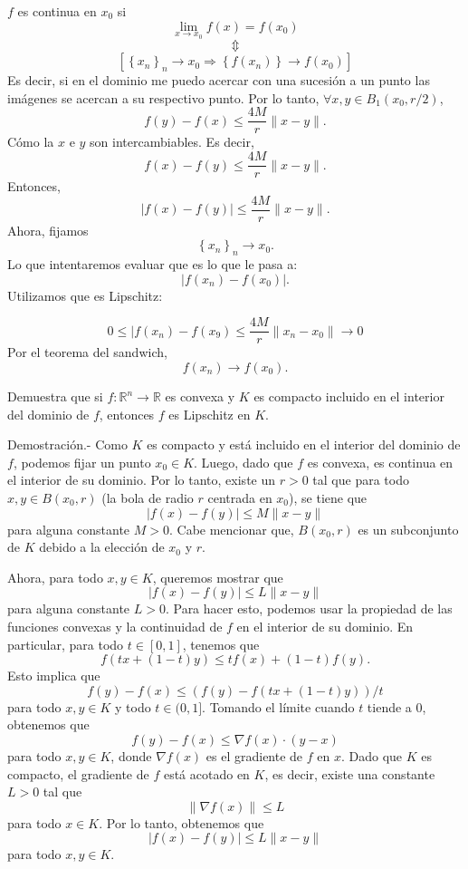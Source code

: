 \begin{paracol}{2}
\begin{teo}
{	    $f$ es continua en $x_0$ si 
	    $$\lim_{x\to x_0}f(x)=f(x_0)$$ 
	    $$\Updownarrow$$
	    $$\left[\left\{x_n\right\}_n\to x_0 \Rightarrow \left\{f(x_n)\right\}\to f(x_0)\right]$$
	    Es decir, si en el dominio me puedo acercar con una sucesión a un punto las imágenes se acercan a su respectivo punto.
	}
	\switchcolumn[0]\noindent
	Por lo tanto, $\forall x,y\in B_1(x_0,r/2)$,
	$$f(y)-f(x)\leq \dfrac{4M}{r}\|x-y\|.$$
	Cómo la $x$ e $y$ son intercambiables. Es decir,
	$$f(x)-f(y)\leq \dfrac{4M}{r}\|x-y\|.$$
	Entonces,
	$$|f(x)-f(y)|\leq \dfrac{4M}{r}\|x-y\|.$$
	Ahora, fijamos 
	$$\left\{x_n\right\}_n\to x_0.$$
	Lo que intentaremos evaluar que es lo que le pasa a:
	$$|f(x_n)-f(x_0)|.$$
	Utilizamos que es Lipschitz:

	$$0\leq |f(x_n)-f(x_9)\leq \dfrac{4M}{r}\|x_n-x_0\|\to 0$$
	Por el teorema del sandwich,
	$$f(x_n)\to f(x_0).$$
\end{teo}

{\color{blue}
\begin{teo} Demuestra que si $f:\mathbb{R}^n\to \mathbb{R}$ es convexa y $K$ es compacto incluido en el interior del dominio de $f$, entonces $f$ es Lipschitz en $K$.

    Demostración.-\; Como $K$ es compacto y está incluido en el interior del dominio de $f$, podemos fijar un punto $x_0 \in K$. Luego, dado que $f$ es convexa, es continua en el interior de su dominio. Por lo tanto, existe un $r > 0$ tal que para todo $x, y \in B(x_0, r)$ (la bola de radio $r$ centrada en $x_0$), se tiene que 
    $$|f(x) - f(y)| \leq M \|x - y\|$$ 
    para alguna constante $M > 0$. Cabe mencionar que, $B(x_0, r)$ es un subconjunto de $K$ debido a la elección de $x_0$ y $r$.

    Ahora, para todo $x, y \in K$, queremos mostrar que 
    $$|f(x) - f(y)| \leq L \|x - y\|$$ 
    para alguna constante $L > 0$. Para hacer esto, podemos usar la propiedad de las funciones convexas y la continuidad de $f$ en el interior de su dominio. En particular, para todo $t \in [0, 1]$, tenemos que 
    $$f(tx + (1 - t)y) \leq t f(x) + (1 - t) f(y).$$ 
    Esto implica que 
    $$f(y) - f(x) \leq (f(y) - f(tx + (1 - t)y))/t$$ 
    para todo $x, y \in K$ y todo $t \in (0, 1]$. Tomando el límite cuando $t$ tiende a $0$, obtenemos que 
    $$f(y) - f(x) \leq \nabla f(x) \cdot (y - x)$$ 
    para todo $x, y \in K$, donde $\nabla f(x)$ es el gradiente de $f$ en $x$. Dado que $K$ es compacto, el gradiente de $f$ está acotado en $K$, es decir, existe una constante $L > 0$ tal que 
    $$\|\nabla f(x)\| \leq L$$ 
    para todo $x \in K$. Por lo tanto, obtenemos que 
    $$|f(x) - f(y)| \leq L \|x - y\|$$ 
    para todo $x, y \in K$.


\end{teo}}
\end{paracol}
